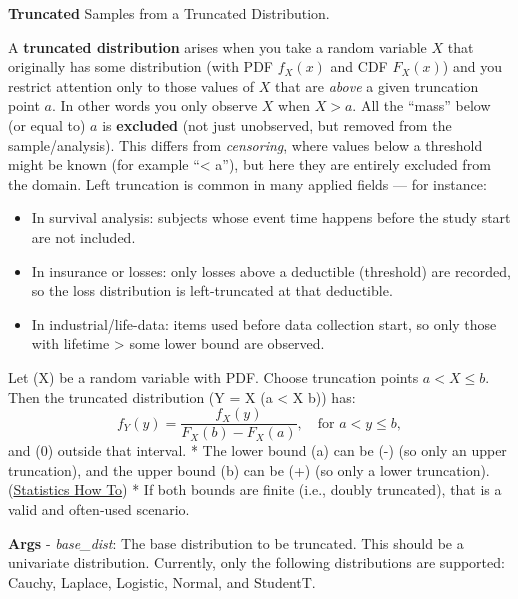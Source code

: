 \documentclass[
  letterpaper,
  DIV=11,
  numbers=noendperiod]{scrartcl}
\providecommand{\tightlist}{%
  \setlength{\itemsep}{0pt}\setlength{\parskip}{0pt}}\usepackage{longtable,booktabs,array}
\begin{document}
\textbf{Truncated} Samples from a Truncated Distribution.

A \textbf{truncated distribution} arises when you take a random variable
\(X\) that originally has some distribution (with PDF \(f_X(x)\) and CDF
\(F_X(x)\)) and you restrict attention only to those values of \(X\)
that are \emph{above} a given truncation point \(a\). In other words you
only observe \(X\) when \(X > a\). All the ``mass'' below (or equal to)
\(a\) is \textbf{excluded} (not just unobserved, but removed from the
sample/analysis). This differs from \emph{censoring}, where values below
a threshold might be known (for example ``\textless{} a''), but here
they are entirely excluded from the domain. Left truncation is common in
many applied fields --- for instance:

\begin{itemize}
\tightlist
\item
  In survival analysis: subjects whose event time happens before the
  study start are not included.
\item
  In insurance or losses: only losses above a deductible (threshold) are
  recorded, so the loss distribution is left-truncated at that
  deductible.
\item
  In industrial/life-data: items used before data collection start, so
  only those with lifetime \textgreater{} some lower bound are observed.
\end{itemize}

Let (X) be a random variable with PDF. Choose truncation points
\(a < X \le b\). Then the truncated distribution (Y = X \mid (a
\textless{} X \le b)) has:\\
\[
  f_Y(y) = \frac{f_X(y)}{F_X(b) - F_X(a)}, \quad \text{for } a < y \le b,
  \] and (0) outside that interval. * The lower bound (a) can be
(-\infty) (so only an upper truncation), and the upper bound (b) can be
(+\infty) (so only a lower truncation).
(\href{https://statproofbook.github.io/P/matn-pdf.html}{Statistics How
To}) * If both bounds are finite (i.e., doubly truncated), that is a
valid and often‐used scenario.

\textbf{Args} - \emph{base\_dist}: The base distribution to be
truncated. This should be a univariate distribution. Currently, only the
following distributions are supported: Cauchy, Laplace, Logistic,
Normal, and StudentT.
\end{document}
